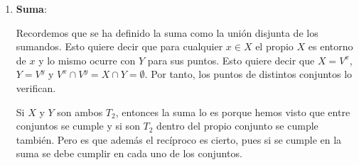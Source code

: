 \begin{demo}
\begin{enumerate}
    \item \textbf{Suma}:
    
    Recordemos que se ha definido la suma como la unión disjunta de los sumandos. Esto quiere decir que para cualquier $x\in X$ el propio $X$ es entorno de $x$ y lo mismo ocurre con $Y$ para sus puntos. Esto quiere decir que $X=V^x$, $Y=V^y$ y $V^x \cap V^y = X\cap Y = \emptyset$. Por tanto, los puntos de distintos conjuntos lo verifican.
    
    Si $X$ y $Y$ son ambos $T_2$, entonces la suma lo es porque hemos visto que entre conjuntos se cumple y si son $T_2$ dentro del propio conjunto se cumple también. Pero es que además el recíproco es cierto, pues si se cumple en la suma se debe cumplir en cada uno de los conjuntos.
\end{enumerate}    
\end{demo}

